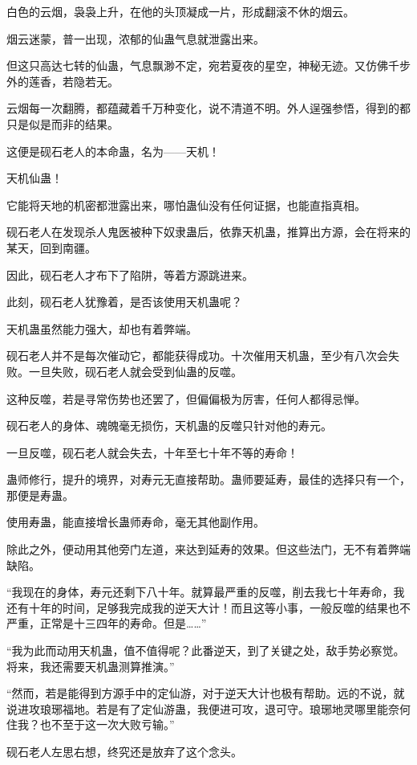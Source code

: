 \begin{this_body}
白色的云烟，袅袅上升，在他的头顶凝成一片，形成翻滚不休的烟云。

烟云迷蒙，普一出现，浓郁的仙蛊气息就泄露出来。

但这只高达七转的仙蛊，气息飘渺不定，宛若夏夜的星空，神秘无迹。又仿佛千步外的莲香，若隐若无。

云烟每一次翻腾，都蕴藏着千万种变化，说不清道不明。外人逞强参悟，得到的都只是似是而非的结果。

这便是砚石老人的本命蛊，名为——天机！

天机仙蛊！

它能将天地的机密都泄露出来，哪怕蛊仙没有任何证据，也能直指真相。

砚石老人在发现杀人鬼医被种下奴隶蛊后，依靠天机蛊，推算出方源，会在将来的某天，回到南疆。

因此，砚石老人才布下了陷阱，等着方源跳进来。

此刻，砚石老人犹豫着，是否该使用天机蛊呢？

天机蛊虽然能力强大，却也有着弊端。

砚石老人并不是每次催动它，都能获得成功。十次催用天机蛊，至少有八次会失败。一旦失败，砚石老人就会受到仙蛊的反噬。

这种反噬，若是寻常伤势也还罢了，但偏偏极为厉害，任何人都得忌惮。

砚石老人的身体、魂魄毫无损伤，天机蛊的反噬只针对他的寿元。

一旦反噬，砚石老人就会失去，十年至七十年不等的寿命！

蛊师修行，提升的境界，对寿元无直接帮助。蛊师要延寿，最佳的选择只有一个，那便是寿蛊。

使用寿蛊，能直接增长蛊师寿命，毫无其他副作用。

除此之外，便动用其他旁门左道，来达到延寿的效果。但这些法门，无不有着弊端缺陷。

“我现在的身体，寿元还剩下八十年。就算最严重的反噬，削去我七十年寿命，我还有十年的时间，足够我完成我的逆天大计！而且这等小事，一般反噬的结果也不严重，正常是十三四年的寿命。但是……”

“我为此而动用天机蛊，值不值得呢？此番逆天，到了关键之处，敌手势必察觉。将来，我还需要天机蛊测算推演。”

“然而，若是能得到方源手中的定仙游，对于逆天大计也极有帮助。远的不说，就说进攻琅琊福地。若是有了定仙游蛊，我便进可攻，退可守。琅琊地灵哪里能奈何住我？也不至于这一次大败亏输。”

砚石老人左思右想，终究还是放弃了这个念头。


\end{this_body}
